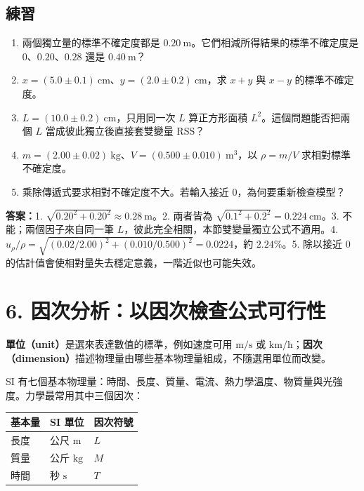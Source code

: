 \documentclass[11pt,a4paper]{article}
\newcounter{none}
\providecommand{\tightlist}{%
  \setlength{\itemsep}{0pt}\setlength{\parskip}{0pt}}
\begin{document}
\begin{HandoutSelfCheck}

\subsection{練習}\label{ux7df4ux7fd2-4}

\begin{enumerate}
\def\labelenumi{\arabic{enumi}.}
\tightlist
\item
  兩個獨立量的標準不確定度都是 \(0.20\ \mathrm{m}\)。它們相減所得結果的標準不確定度是 \(0\)、\(0.20\)、\(0.28\) 還是 \(0.40\ \mathrm{m}\)？
\item
  \(x=(5.0\pm0.1)\ \mathrm{cm}\)、\(y=(2.0\pm0.2)\ \mathrm{cm}\)，求 \(x+y\) 與 \(x-y\) 的標準不確定度。
\item
  \(L=(10.0\pm0.2)\ \mathrm{cm}\)，只用同一次 \(L\) 算正方形面積 \(L^2\)。這個問題能否把兩個 \(L\) 當成彼此獨立後直接套雙變量 RSS？
\item
  \(m=(2.00\pm0.02)\ \mathrm{kg}\)、\(V=(0.500\pm0.010)\ \mathrm{m^3}\)，以 \(\rho=m/V\) 求相對標準不確定度。
\item
  乘除傳遞式要求相對不確定度不大。若輸入接近 0，為何要重新檢查模型？
\end{enumerate}

\textbf{答案：}1. \(\sqrt{0.20^2+0.20^2}\approx0.28\ \mathrm{m}\)。2. 兩者皆為 \(\sqrt{0.1^2+0.2^2}=0.224\ \mathrm{cm}\)。3. 不能；兩個因子來自同一筆 \(L\)，彼此完全相關，本節雙變量獨立公式不適用。4. \(u_\rho/\rho=\sqrt{(0.02/2.00)^2+(0.010/0.500)^2}=0.0224\)，約 \(2.24\%\)。5. 除以接近 0 的估計值會使相對量失去穩定意義，一階近似也可能失效。

\end{HandoutSelfCheck}

\section{6. 因次分析：以因次檢查公式可行性}\label{ux56e0ux6b21ux5206ux6790ux4ee5ux56e0ux6b21ux6aa2ux67e5ux516cux5f0fux53efux884cux6027}

\textbf{單位（unit）}是選來表達數值的標準，例如速度可用 \(\mathrm{m/s}\) 或 \(\mathrm{km/h}\)；\textbf{因次（dimension）}描述物理量由哪些基本物理量組成，不隨選用單位而改變。

SI 有七個基本物理量：時間、長度、質量、電流、熱力學溫度、物質量與光強度。力學最常用其中三個因次：

{\def\LTcaptype{none} %
\begin{longtable}[]{@{}lll@{}}
\toprule\noalign{}
基本量 & SI 單位 & 因次符號 \\
\midrule\noalign{}
\endhead
\bottomrule\noalign{}
\endlastfoot
長度 & 公尺 \(\mathrm{m}\) & \(L\) \\
質量 & 公斤 \(\mathrm{kg}\) & \(M\) \\
時間 & 秒 \(\mathrm{s}\) & \(T\) \\
\end{longtable}
}
\end{document}
